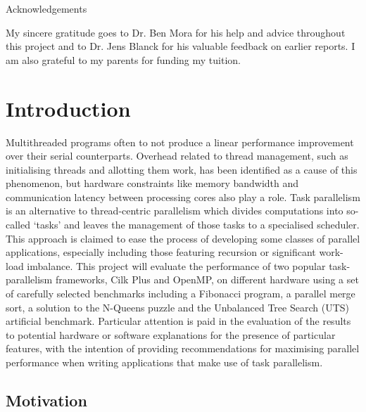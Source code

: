 \documentclass{report}
\begin{document}
\newpage
\begin{center}
{\huge Acknowledgements}
\end{center}
\hfill
\newline
\newline

\noindent
My sincere gratitude goes to Dr. Ben Mora for his help and advice throughout this project and to Dr. Jens Blanck for his valuable feedback on earlier reports. I am also grateful to my parents for funding my tuition.

\singlespacing
\newpage
\tableofcontents
\newpage
\listoffigures
\newpage
{}
\onehalfspacing

\chapter{Introduction} \label{Sec:introduction}

Multithreaded programs often to not produce a linear performance improvement over their serial counterparts. Overhead related to thread management, such as initialising threads and allotting them work, has been identified as a cause of this phenomenon, but hardware constraints like memory bandwidth and communication latency between processing cores also play a role\cite{Andrews99}. Task parallelism is an alternative to thread-centric parallelism which divides computations into so-called `tasks' and leaves the management of those tasks to a specialised scheduler\cite{Andrews99}. This approach is claimed to ease the process of developing some classes of parallel applications, especially including those featuring recursion or significant work-load imbalance\cite{Olivier09}. This project will evaluate the performance of two popular task-parallelism frameworks, Cilk Plus and OpenMP, on different hardware using a set of carefully selected benchmarks including a Fibonacci program, a parallel merge sort, a solution to the N-Queens puzzle and the Unbalanced Tree Search (UTS) artificial benchmark. Particular attention is paid in the evaluation of the results to potential hardware or software explanations for the presence of particular features, with the intention of providing recommendations for maximising parallel performance when writing applications that make use of task parallelism.

\section{Motivation} \label{Sec:motivation}
\end{document}
